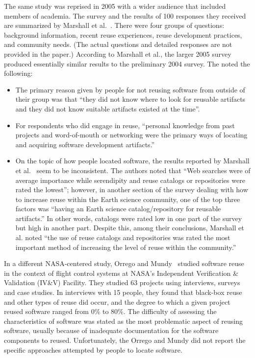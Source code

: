 \documentclass{casicswhitepaper}
\begin{document}
The same study was reprised in 2005 with a wider audience that included members of academia.  The survey and the results of 100 responses they received are summarized by Marshall et al.~\cite{marshall2006software}.  There were four groups of questions: background information, recent reuse experiences, reuse development practices, and community needs.  (The actual questions and detailed responses are not provided in the paper.)  According to Marshall et al., the larger 2005 survey produced essentially similar results to the preliminary 2004 survey.  The noted the following:
\begin{itemize}

\item The primary reason given by people for not reusing software from outside of their group was that ``they did not know where to look for reusable artifacts and they did not know suitable artifacts existed at the time''.

\item For respondents who did engage in reuse, ``personal knowledge from past projects and word-of-mouth or networking were the primary ways of locating and acquiring software development artifacts.''  

\item On the topic of how people located software, the results reported by Marshall et al.~\cite{marshall2006software} seem to be inconsistent.  The authors noted that ``Web searches were of average importance while serendipity and reuse catalogs or repositories were rated the lowest''; however, in another section of the survey dealing with how to increase reuse within the Earth science community, one of the top three factors was ``having an Earth science catalog/repository for reusable artifacts.''  In other words, catalogs were rated low in one part of the survey but high in another part.  Despite this, among their conclusions, Marshall et al. noted ``the use of reuse catalogs and repositories was rated the most important method of increasing the level of reuse within the community.''

\end{itemize}

In a different NASA-centered study, Orrego and Mundy~\cite{orrego_2007_study} studied software reuse in the context of flight control systems at NASA's Independent Verification \& Validation (IV\&V) Facility.  They studied 63 projects using interviews, surveys and case studies.  In interviews with 15 people, they found that black-box reuse and other types of reuse did occur, and the degree to which a given project reused software ranged from 0\% to 80\%.  The difficulty of assessing the characteristics of software was stated as the most problematic aspect of reusing software, usually because of inadequate documentation for the software components to reused.  Unfortunately, the Orrego and Mundy did not report the specific approaches attempted by people to locate software.
\end{document}
